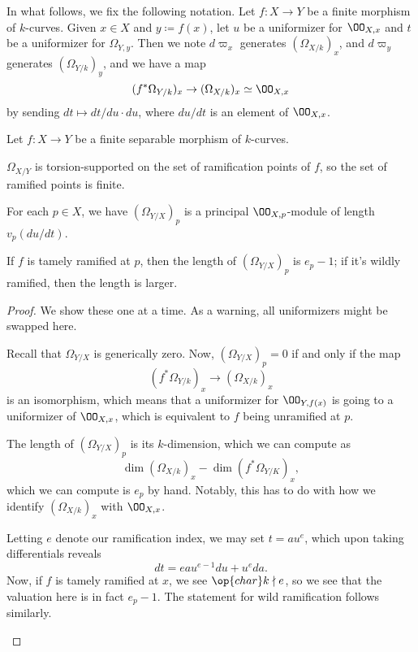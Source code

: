 \documentclass[../notes.tex]{subfiles}
\begin{document}
In what follows, we fix the following notation. Let $f\colon X\to Y$ be a finite morphism of $k$-curves. Given $x\in X$ and $y\coloneqq f(x)$, let $u$ be a uniformizer for $\OO_{X,x}$ and $t$ be a uniformizer for $\Omega_{Y,y}$. Then we note $d\varpi_x$ generates $(\Omega_{X/k})_x$, and $d\varpi_y$ generates $(\Omega_{Y/k})_y$, and we have a map
\[(f^*\Omega_{Y/k})_x\to(\Omega_{X/k})_x\simeq\OO_{X,x}\]
by sending $dt\mapsto dt/du\cdot du$, where $du/dt$ is an element of $\OO_{X,x}$.
\begin{proposition}
	Let $f\colon X\to Y$ be a finite separable morphism of $k$-curves.
	\begin{listalph}
		\item $\Omega_{X/Y}$ is torsion-supported on the set of ramification points of $f$, so the set of ramified points is finite.
		\item For each $p\in X$, we have $(\Omega_{Y/X})_p$ is a principal $\OO_{X,p}$-module of length $v_p(du/dt)$.
		\item If $f$ is tamely ramified at $p$, then the length of $(\Omega_{Y/X})_p$ is $e_p-1$; if it's wildly ramified, then the length is larger.
	\end{listalph}
\end{proposition}
\begin{proof}
	We show these one at a time. As a warning, all uniformizers might be swapped here.
	\begin{listalph}
		\item Recall that $\Omega_{Y/X}$ is generically zero. Now, $(\Omega_{Y/X})_p=0$ if and only if the map
		\[(f^*\Omega_{Y/k})_x\to(\Omega_{X/k})_x\]
		is an isomorphism, which means that a uniformizer for $\OO_{Y,f(x)}$ is going to a uniformizer of $\OO_{X,x}$, which is equivalent to $f$ being unramified at $p$.
		\item The length of $(\Omega_{Y/X})_p$ is its $k$-dimension, which we can compute as
		\[\dim(\Omega_{X/k})_x-\dim (f^*\Omega_{Y/K})_x,\]
		which we can compute is $e_p$ by hand. Notably, this has to do with how we identify $(\Omega_{X/k})_x$ with $\OO_{X,x}$.
		\item Letting $e$ denote our ramification index, we may set $t=au^e$, which upon taking differentials reveals
		\[dt=eau^{e-1}du+u^eda.\]
		Now, if $f$ is tamely ramified at $x$, we see $\op{char}k\nmid e$, so we see that the valuation here is in fact $e_p-1$. The statement for wild ramification follows similarly.
		\qedhere
	\end{listalph}
\end{proof}
\end{document}
